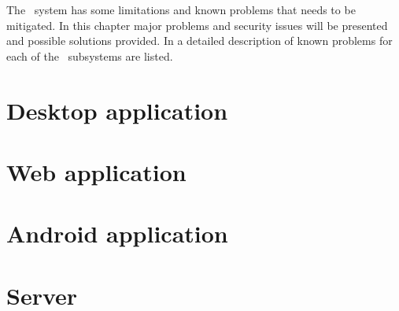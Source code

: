 The \appName\ system has some limitations and known problems that needs to be
mitigated. In this chapter major problems and security issues will be presented
and possible solutions provided. In  a detailed
description of known problems for each of the \appName\ subsystems are listed.

\section{Desktop application}
\FloatBarrier
\section{Web application}

\FloatBarrier
\section{Android application}
\section{Server}


